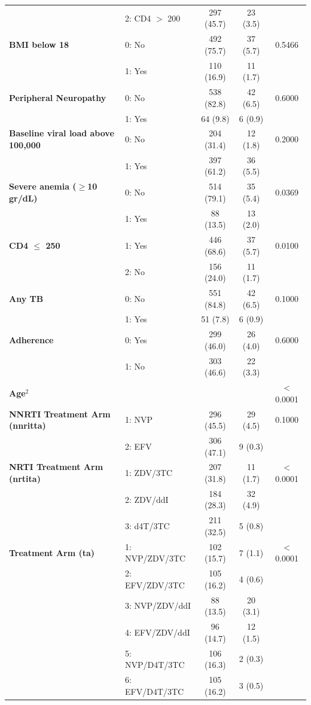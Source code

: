 \documentclass[10pt]{NSP1}
\begin{document}
\begin{table}[!htbp]
\begin{tabularx}{\textwidth}{@{}p{6.5cm} X c c c@{}}
        & 2: CD4 $>$ 200 & 297 (45.7) & 23 (3.5)& \\
        \addlinespace
        \textbf{BMI below 18} & 0: No & 492 (75.7) & 37 (5.7)  & 0.5466 \\
        & 1: Yes & 110 (16.9) & 11 (1.7) & \\
        \addlinespace
        \textbf{Peripheral Neuropathy} & 0: No & 538 (82.8) & 42 (6.5) & 0.6000 \\
        & 1: Yes & 64 (9.8) & 6 (0.9) &\\
        \addlinespace
        \textbf{Baseline viral load above 100,000} & 0: No & 204 (31.4) & 12 (1.8) & 0.2000 \\
        & 1: Yes & 397 (61.2) & 36 (5.5)& \\
        \addlinespace
        \textbf{Severe anemia ($\ge$10 gr/dL)} & 0: No & 514 (79.1) & 35 (5.4) & 0.0369 \\
        & 1: Yes & 88 (13.5) & 13 (2.0) &\\
        \addlinespace
        \textbf{CD4 $\le$ 250} & 1: Yes & 446 (68.6) & 37 (5.7)& 0.0100 \\
        & 2: No & 156 (24.0) & 11 (1.7) & \\
        \addlinespace
        \textbf{Any TB} & 0: No & 551 (84.8) & 42 (6.5) & 0.1000 \\
        & 1: Yes & 51 (7.8) & 6 (0.9)& \\
        \addlinespace
        \textbf{Adherence} & 0: Yes & 299 (46.0) & 26 (4.0) & 0.6000 \\
        & 1: No & 303 (46.6) & 22 (3.3) &\\
        \addlinespace
        \textbf{Age$^2$} & & & & $<$0.0001 \\
        \addlinespace
        \textbf{NNRTI Treatment Arm (nnritta)} & 1: NVP & 296 (45.5) & 29 (4.5) & 0.1000 \\
        & 2: EFV & 306 (47.1) & 9 (0.3) &\\
        \addlinespace
        \textbf{NRTI Treatment Arm (nrtita)} & 1: ZDV/3TC & 207 (31.8) & 11 (1.7) & $<$0.0001 \\
        & 2: ZDV/ddI & 184 (28.3) & 32 (4.9)& \\
        & 3: d4T/3TC & 211 (32.5) & 5 (0.8) &\\
        \addlinespace
        \textbf{Treatment Arm (ta)} & 1: NVP/ZDV/3TC & 102 (15.7) & 7 (1.1)  & $<$0.0001 \\
        & 2: EFV/ZDV/3TC & 105 (16.2) & 4 (0.6) & \\
        & 3: NVP/ZDV/ddI & 88 (13.5) & 20 (3.1) & \\
        & 4: EFV/ZDV/ddI & 96 (14.7) & 12 (1.5) & \\
        & 5: NVP/D4T/3TC & 106 (16.3) & 2 (0.3) & \\
        & 6: EFV/D4T/3TC & 105 (16.2) & 3 (0.5) & \\
        \bottomrule
    \end{tabularx}
\end{table}
\end{document}
